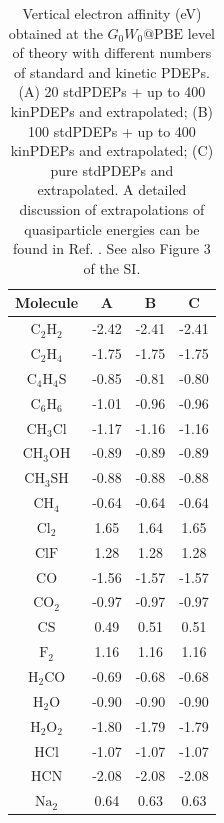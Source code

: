 \documentclass[aip,preprint]{revtex4-1}
\begin{document}
\begin{table}
    \centering
    \caption{Vertical electron affinity (eV) obtained at the $G_0W_0@\mathrm{PBE}$ level of theory with different numbers of standard and kinetic PDEPs. (A) 20 stdPDEPs + up to 400 kinPDEPs and extrapolated; (B) 100 stdPDEPs  + up to 400 kinPDEPs and extrapolated; (C) pure stdPDEPs and extrapolated. A detailed discussion of extrapolations of quasiparticle energies can be found in Ref. . See also  Figure 3 of the SI.\label{tab:EA-PBE-small}}
    \begin{tabular}{cccc}
    \hline\hline
    Molecule & A & B & C \\
    \hline
  $\mathrm{C_2H_2}$ &  -2.42 &  -2.41 &  -2.41 \\
  $\mathrm{C_2H_4}$ &  -1.75 &  -1.75 &  -1.75 \\
 $\mathrm{C_4H_4S}$ &  -0.85 &  -0.81 &  -0.80 \\
  $\mathrm{C_6H_6}$ &  -1.01 &  -0.96 &  -0.96 \\
 $\mathrm{CH_3Cl}$  &  -1.17 &  -1.16 &  -1.16 \\
 $\mathrm{CH_3OH}$  &  -0.89 &  -0.89 &  -0.89 \\
 $\mathrm{CH_3SH}$  &  -0.88 &  -0.88 &  -0.88 \\
   $\mathrm{CH_4}$  &  -0.64 &  -0.64 &  -0.64 \\
   $\mathrm{Cl_2}$  &   1.65 &   1.64 &   1.65 \\
   $\mathrm{ClF}$   &   1.28 &   1.28 &   1.28 \\
    $\mathrm{CO}$   &  -1.56 &  -1.57 &  -1.57 \\
   $\mathrm{CO_2}$  &  -0.97 &  -0.97 &  -0.97 \\
    $\mathrm{CS}$   &   0.49 &   0.51 &   0.51 \\
    $\mathrm{F_2}$  &   1.16 &   1.16 &   1.16 \\
  $\mathrm{H_2CO}$  &  -0.69 &  -0.68 &  -0.68 \\
   $\mathrm{H_2O}$  &  -0.90 &  -0.90 &  -0.90 \\
  $\mathrm{H_2O_2}$ &  -1.80 &  -1.79 &  -1.79 \\
   $\mathrm{HCl}$   &  -1.07 &  -1.07 &  -1.07 \\
   $\mathrm{HCN}$   &  -2.08 &  -2.08 &  -2.08 \\
   $\mathrm{Na_2}$  &   0.64 &   0.63 &   0.63 \\
   \hline\hline
    \end{tabular}
\end{table}
\end{document}
